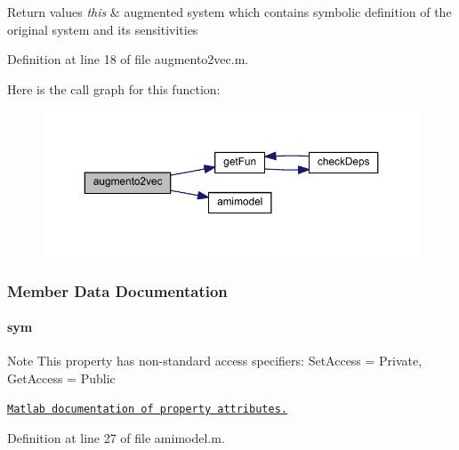 \begin{DoxyRetVals}{Return values}
{\em this} & augmented system which contains symbolic definition of the original system and its sensitivities \\
\hline
\end{DoxyRetVals}


Definition at line 18 of file augmento2vec.\+m.



Here is the call graph for this function\+:
\nopagebreak
\begin{figure}[H]
\begin{center}
\leavevmode
\includegraphics[width=350pt]{classamimodel_aaed774df1b9efcebe493ae9f499bb8cf_cgraph}
\end{center}
\end{figure}




\subsubsection{Member Data Documentation}
\hypertarget{classamimodel_a3c48fff3d28406486a4f1b5e18da7ca6}{}
\paragraph[{sym}]{\setlength{\rightskip}{0pt plus 5cm}sym}\label{classamimodel_a3c48fff3d28406486a4f1b5e18da7ca6}
\begin{DoxyNote}{Note}
This property has non-\/standard access specifiers\+: {\ttfamily Set\+Access = Private, Get\+Access = Public} 

\href{http://www.mathworks.com/help/matlab/matlab_oop/property-attributes.html}{\tt Matlab documentation of property attributes.} 
\end{DoxyNote}


Definition at line 27 of file amimodel.\+m.

\hypertarget{classamimodel_a743fa290dbc0a67a3843d5ab0426e9b4}{}
